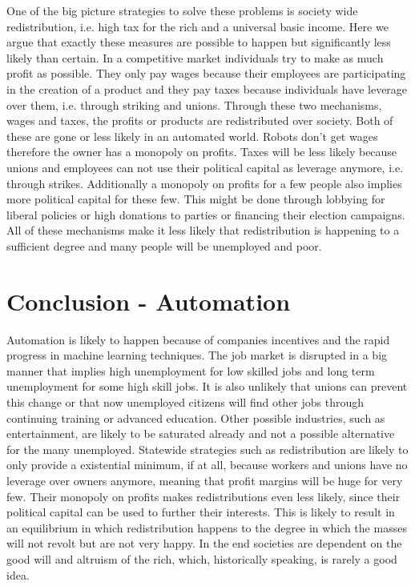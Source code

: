 \documentclass[conference]{IEEEtran}
\begin{document}
One of the big picture strategies to solve these problems is society wide redistribution, i.e. high tax for the rich and a universal basic income. Here we argue that exactly these measures are possible to happen but significantly less likely than certain. In a competitive market individuals try to make as much profit as possible. They only pay wages because their employees are participating in the creation of a product and they pay taxes because individuals have leverage over them, i.e. through striking and unions. Through these two mechanisms, wages and taxes, the profits or products are redistributed over society. Both of these are gone or less likely in an automated world. Robots don't get wages therefore the owner has a monopoly on profits. Taxes will be less likely because unions and employees can not use their political capital as leverage anymore, i.e. through strikes. Additionally a monopoly on profits for a few people also implies more political capital for these few. This might be done through lobbying for liberal policies or high donations to parties or financing their election campaigns. All of these mechanisms make it less likely that redistribution is happening to a sufficient degree and many people will be unemployed and poor.

\section{Conclusion - Automation}
%
Automation is likely to happen because of companies incentives and the rapid progress in machine learning techniques. The job market is disrupted in a big manner that implies high unemployment for low skilled jobs and long term unemployment for some high skill jobs. It is also unlikely that unions can prevent this change or that now unemployed citizens will find other jobs through continuing training or advanced education. Other possible industries, such as entertainment, are likely to be saturated already and not a possible alternative for the many unemployed. Statewide strategies such as redistribution are likely to only provide a existential minimum, if at all, because workers and unions have no leverage over owners anymore, meaning that profit margins will be huge for very few. Their monopoly on profits makes redistributions even less likely, since their political capital can be used to further their interests. This is likely to result in an equilibrium in which redistribution happens to the degree in which the masses will not revolt but are not very happy. In the end societies are dependent on the good will and altruism of the rich, which, historically speaking, is rarely a good idea.
\end{document}
